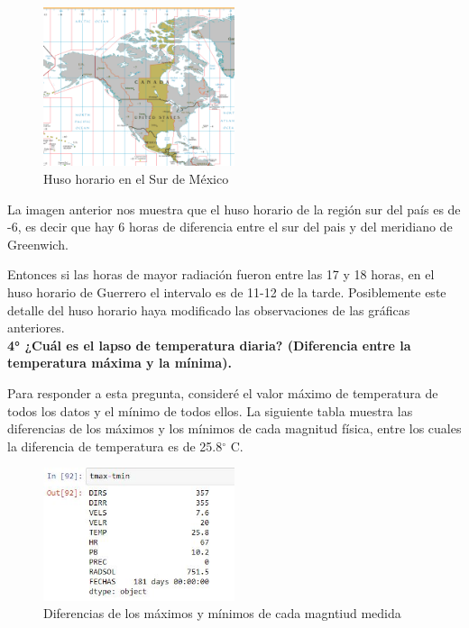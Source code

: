 \documentclass[a4paper]{article}
\begin{document}
\begin{figure}[ht!]
\centering
\includegraphics[width=0.5\textwidth]{Husos_horarios.jpg}
\caption{\label{fig:Radación Solar}Huso horario en el Sur de México}
\end{figure}

La imagen anterior nos muestra que el huso horario de la región sur del país es de -6, es decir que hay 6 horas de diferencia entre el sur del pais y del meridiano de Greenwich. 

Entonces si las horas de mayor radiación fueron entre las 17 y 18 horas, en el huso horario de Guerrero el intervalo es de 11-12 de la tarde. 
Posiblemente este detalle del huso horario haya modificado las observaciones de las gráficas anteriores.\\

\textbf{4° ¿Cuál es el lapso de temperatura diaria? (Diferencia entre la temperatura máxima y la mínima).}

Para responder a esta pregunta, consideré el valor máximo de temperatura de todos los datos y el mínimo de todos ellos. La siguiente tabla muestra las diferencias de los máximos y los mínimos de cada magnitud física, entre los cuales la diferencia de temperatura es de 25.8$^{\circ}$ C.\\

\newpage
\begin{figure}[ht!]
\centering
\includegraphics[width=0.5\textwidth]{Diferencia_de_temperaturas.JPG}
\caption{\label{fig:Diferencias de los máximos y mínimos de cada magntiud medida }Diferencias de los máximos y mínimos de cada magntiud medida}
\end{figure} 
\end{document}
